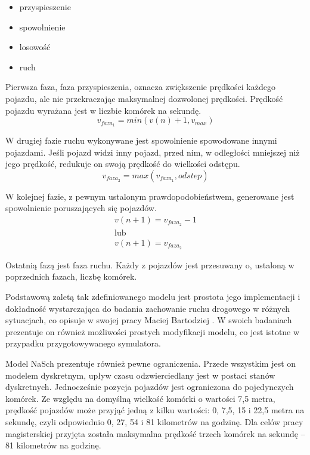 \begin{itemize}
	\item przyspieszenie
	\item spowolnienie
	\item losowość
	\item ruch
\end{itemize}

Pierwsza faza, faza przyspieszenia, oznacza zwiększenie prędkości każdego pojazdu, ale nie przekraczając maksymalnej dozwolonej prędkości.
Prędkość pojazdu wyrażana jest w liczbie komórek na sekundę.
\begin {equation}
	v_{faza_1} = min (v(n) + 1, v_{max})
\end {equation}

W drugiej fazie ruchu wykonywane jest spowolnienie spowodowane innymi pojazdami. Jeśli pojazd widzi inny pojazd, przed nim, w odległości mniejszej niż jego prędkość, redukuje on swoją prędkość do wielkości odstępu.
\begin {equation}
	v_{faza_2} = max (v_{faza_1}, odstep)
\end{equation}

W kolejnej fazie, z pewnym ustalonym prawdopodobieństwem, generowane jest spowolnienie poruszających się pojazdów.
\begin {equation}
	\begin{array} {c}
		v(n+1) = v_{faza_2} - 1\\
		\textrm{lub}\\
		v(n+1) = v_{faza_2}
	\end{array}
\end{equation}

Ostatnią fazą jest faza ruchu. Każdy z pojazdów jest przesuwany o, ustaloną w poprzednich fazach, liczbę komórek.

Podstawową zaletą tak zdefiniowanego modelu jest prostota jego implementacji i dokładność wystarczająca do badania zachowanie ruchu drogowego w różnych sytuacjach, co opisuje w swojej pracy Maciej Bartodziej \cite{bartodziej}. W swoich badaniach prezentuje on również możliwości prostych modyfikacji modelu, co jest istotne w przypadku przygotowywanego symulatora.

Model NaSch prezentuje również pewne ograniczenia. Przede wszystkim jest on modelem dyskretnym, upływ czasu odzwierciedlany jest w postaci stanów dyskretnych. Jednocześnie pozycja pojazdów jest ograniczona do pojedynczych komórek. Ze względu na domyślną wielkość komórki o wartości 7,5 metra, prędkość pojazdów może przyjąć jedną z kilku wartości: 0, 7,5, 15 i 22,5 metra na sekundę, czyli odpowiednio 0, 27, 54 i 81 kilometrów na godzinę. Dla celów pracy magisterskiej przyjęta została maksymalna prędkość trzech komórek na sekundę -- 81 kilometrów na godzinę.

